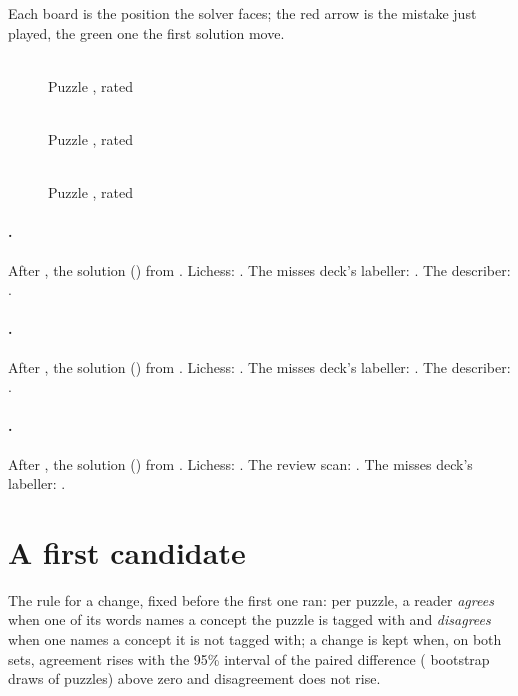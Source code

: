 \documentclass[11pt]{article}
\begin{document}
Each board is the position the solver faces; the red arrow is the mistake just played, the
green one the first solution move.

\begin{figure}[h]
\centering
\begin{minipage}[t]{0.31\textwidth}\centering
\PinBoard\\[0.3em]
\footnotesize Puzzle \texttt{\PinId}, rated \PinRating
\end{minipage}\hfill
\begin{minipage}[t]{0.31\textwidth}\centering
\SkewerBoard\\[0.3em]
\footnotesize Puzzle \texttt{\SkewerId}, rated \SkewerRating
\end{minipage}\hfill
\begin{minipage}[t]{0.31\textwidth}\centering
\ForkBoard\\[0.3em]
\footnotesize Puzzle \texttt{\ForkId}, rated \ForkRating
\end{minipage}
\end{figure}

\paragraph{\PinId.} After \PinFirst, the solution \PinLine{} (\PinUci) from \PinFen. Lichess:
\PinThemes. The misses deck's labeller: \PinBest. The describer: \PinMove.

\paragraph{\SkewerId.} After \SkewerFirst, the solution \SkewerLine{} (\SkewerUci) from
\SkewerFen. Lichess: \SkewerThemes. The misses deck's labeller: \SkewerBest. The describer:
\SkewerMove.

\paragraph{\ForkId.} After \ForkFirst, the solution \ForkLine{} (\ForkUci) from \ForkFen.
Lichess: \ForkThemes. The review scan: \ForkBlunder. The misses deck's labeller: \ForkBest.

\section{A first candidate}

The rule for a change, fixed before the first one ran: per puzzle, a reader \emph{agrees} when one
of its words names a concept the puzzle is tagged with and \emph{disagrees} when one names a
concept it is not tagged with; a change is kept when, on both sets, agreement rises with the 95\%
interval of the paired difference (\CandDraws{} bootstrap draws of puzzles) above zero and
disagreement does not rise.
\end{document}

